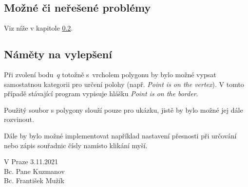 \documentclass[a4paper, 12pt, oneside, titlepage]{article} %
\begin{document}
\subsection{Možné či neřešené problémy}
Viz níže v kapitole \ref{vylepseni}.


\subsection{Náměty na vylepšení} \label{vylepseni}
Při zvolení bodu~$q$ totožně s~vrcholem polygonu by bylo možné vypsat samostatnou kategorii pro určení polohy (např. \emph{Point is on the vertex}). V tomto případě stávající program vypisuje hlášku \emph{Point is on the border}.

Použitý soubor s polygony slouží pouze pro ukázku, jistě by bylo možné jej dále rozvinout. 

Dále by bylo možné implementovat například nastavení přesnosti při určování nebo zápis souřadnic čísly namísto klikání myší.


\begin{flushright}
V Praze 3.11.2021\\
\vspace{2mm}
Bc. Pane Kuzmanov\\
Bc. František Mužík\\
\end{flushright}
\end{document}
